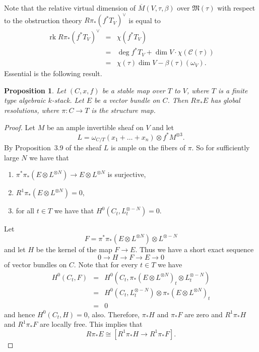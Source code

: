 \documentclass[11pt]{article}
\newcommand{\MM}{\mathfrak{M}}
\newcommand{\cC}{\mathcal{C}}
\newcommand{\dual}[1]{{{#1}^{\vee}}}
\newcommand{\lst}{_{\ast}}
\newcommand{\ol}{\overline}
\DeclareMathOperator{\rk}{rk}
\newcommand{\ses}[5]{0\longrightarrow#1\stackrel{#2}{ \longrightarrow}#3\stackrel{#4}{
\longrightarrow}#5\longrightarrow0}
\newcommand{\upst}{^{\ast}}
\theoremstyle{plain}
\newtheorem{prop}{Proposition}
\theoremstyle{remark}
\newenvironment{pf}{\begin{proof}}{\end{proof}}
\theoremstyle{plain}
\theoremstyle{definition}
\theoremstyle{remark}
\begin{document}
Note that the relative virtual
dimension of \(\ol{M}(V,\tau,\beta)\) over \(\MM(\tau)\) with respect to the
obstruction theory \(\dual{R\pi\lst(f\upst T_V)}\) is equal to
\begin{eqnarray*}
\rk\dual{R\pi\lst(f\upst T_V)} & = & \chi(f\upst T_V) \\
 & = & \deg f\upst T_V+\dim V\cdot\chi(\cC(\tau)) \\
 & = & \chi(\tau)\dim V-\beta(\tau)(\omega_V).
\end{eqnarray*}
Essential is the following result.

\begin{prop} \label{egr}
Let \((C,x,f)\) be a stable map over \(T\) to \(V\), where \(T\) is a finite
type algebraic \(k\)-stack. Let \(E\) be a vector bundle on \(C\). Then
\(R\pi\lst E\) has global resolutions, where \(\pi:C\rightarrow T\) is the
structure map.
\end{prop}
\begin{pf}
Let \(M\) be an ample invertible sheaf on \(V\) and let
\[
L=\omega_{C/T}(x_1+\ldots+x_n)\otimes f\upst M^{\otimes 3}.
\]
By Proposition~3.9 of \cite{BM} the sheaf \(L\) is ample on the fibers
of \(\pi\). So for sufficiently large \(N\) we have that
\begin{enumerate}
\item \(\pi\upst\pi\lst(E\otimes L^{\otimes N})\rightarrow E\otimes
L^{\otimes N} \) is surjective,
\item \(R^1\pi\lst(E\otimes L^{\otimes N})=0\),
\item for all \(t\in T\) we have that \(H^0(C_t,L^{\otimes -N}_t)=0\).
\end{enumerate}
Let
\[
F=\pi\upst\pi\lst(E\otimes L^{\otimes N})\otimes L^{\otimes
-N}
\]
and let \(H\) be the kernel of the map \(F\to E\). Thus we have a
short exact sequence
\[
\ses{H}{}{F}{}{E}
\]
of vector bundles on \(C\). Note that for every
\(t\in T\) we have
\begin{eqnarray*}
H^0(C_t,F) & = & H^0(C_t,\pi\lst(E\otimes L^{\otimes N})_t\otimes L_t^{\otimes
-N})  \\    & = & H^0(C_t,L_t^{\otimes -N})\otimes\pi\lst(E\otimes
L^{\otimes N})_t \\ & = & 0
\end{eqnarray*}
and hence \(H^0(C_t,H)=0\),
also. Therefore, \(\pi\lst H\) and \(\pi\lst F\) are zero and \(R^1\pi\lst
H\) and \(R^1\pi\lst F\) are locally free. This implies that
\[
R\pi\lst
E\cong [R^1\pi\lst H\rightarrow R^1\pi\lst F].
\]
\end{pf}
\end{document}
